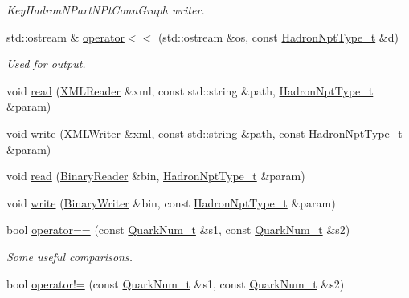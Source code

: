 \begin{DoxyCompactItemize}
\begin{DoxyCompactList}\small\item\em Key\+Hadron\+N\+Part\+N\+Pt\+Conn\+Graph writer. \end{DoxyCompactList}\item 
std\+::ostream \& \mbox{\hyperlink{namespaceHadron_ae2a5c7a5ffdda238337fd194679743a6}{operator$<$$<$}} (std\+::ostream \&os, const \mbox{\hyperlink{structHadron_1_1HadronNptType__t}{Hadron\+Npt\+Type\+\_\+t}} \&d)
\begin{DoxyCompactList}\small\item\em Used for output. \end{DoxyCompactList}\item 
void \mbox{\hyperlink{namespaceHadron_ae9e95e7c9b97a878e77c48ea5619a53a}{read}} (\mbox{\hyperlink{classADATXML_1_1XMLReader}{X\+M\+L\+Reader}} \&xml, const std\+::string \&path, \mbox{\hyperlink{structHadron_1_1HadronNptType__t}{Hadron\+Npt\+Type\+\_\+t}} \&param)
\item 
void \mbox{\hyperlink{namespaceHadron_a3ba652c4917e69b9056f2dd7621483df}{write}} (\mbox{\hyperlink{classADATXML_1_1XMLWriter}{X\+M\+L\+Writer}} \&xml, const std\+::string \&path, const \mbox{\hyperlink{structHadron_1_1HadronNptType__t}{Hadron\+Npt\+Type\+\_\+t}} \&param)
\item 
void \mbox{\hyperlink{namespaceHadron_a7f12085b340a6e0bfb52b3d920cfeb1e}{read}} (\mbox{\hyperlink{classADATIO_1_1BinaryReader}{Binary\+Reader}} \&bin, \mbox{\hyperlink{structHadron_1_1HadronNptType__t}{Hadron\+Npt\+Type\+\_\+t}} \&param)
\item 
void \mbox{\hyperlink{namespaceHadron_a0051134178fb8346e89720a478b8a8f1}{write}} (\mbox{\hyperlink{classADATIO_1_1BinaryWriter}{Binary\+Writer}} \&bin, const \mbox{\hyperlink{structHadron_1_1HadronNptType__t}{Hadron\+Npt\+Type\+\_\+t}} \&param)
\item 
bool \mbox{\hyperlink{namespaceHadron_a6a6810ed7f262fbb4167534023c0b191}{operator==}} (const \mbox{\hyperlink{structHadron_1_1QuarkNum__t}{Quark\+Num\+\_\+t}} \&s1, const \mbox{\hyperlink{structHadron_1_1QuarkNum__t}{Quark\+Num\+\_\+t}} \&s2)
\begin{DoxyCompactList}\small\item\em Some useful comparisons. \end{DoxyCompactList}\item 
bool \mbox{\hyperlink{namespaceHadron_aa7483984b4c081a23ba486c97ca05f5a}{operator!=}} (const \mbox{\hyperlink{structHadron_1_1QuarkNum__t}{Quark\+Num\+\_\+t}} \&s1, const \mbox{\hyperlink{structHadron_1_1QuarkNum__t}{Quark\+Num\+\_\+t}} \&s2)

\end{DoxyCompactItemize}
